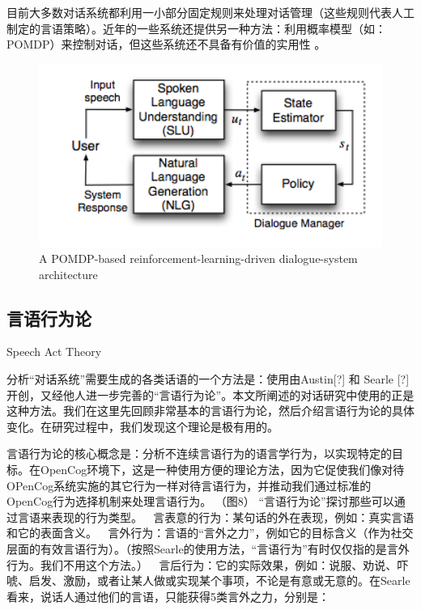 目前大多数对话系统都利用一小部分固定规则来处理对话管理（这些规则代表人工制定的言语策略）。近年的一些系统还提供另一种方法：利用概率模型（如：POMDP）来控制对话，但这些系统还不具备有价值的实用性\cite{Young2006} \cite{Williams2010}。

\begin{figure}[htb]
\centering
\includegraphics[width=12cm]{figures/pomdp.png}
\caption{ A POMDP-based reinforcement-learning-driven dialogue-system architecture }
\label{fig:dialogue}
\end{figure}


\subsection{言语行为论}{Speech Act Theory}
\label{sec:speechAct}

分析“对话系统”需要生成的各类话语的一个方法是：使用由Austin[?] 和 Searle [?] 开创，又经他人进一步完善的“言语行为论”。本文所阐述的对话研究中使用的正是这种方法。我们在这里先回顾非常基本的言语行为论，然后介绍言语行为论的具体变化。在研究过程中，我们发现这个理论是极有用的。

言语行为论的核心概念是：分析不连续言语行为的语言学行为，以实现特定的目标。在OpenCog环境下，这是一种使用方便的理论方法，因为它促使我们像对待OPenCog系统实施的其它行为一样对待言语行为，并推动我们通过标准的OpenCog行为选择机制来处理言语行为。
（图8）
“言语行为论”探讨那些可以通过言语来表现的行为类型。
	言表意的行为：某句话的外在表现，例如：真实言语和它的表面含义。
	言外行为：言语的“言外之力”，例如它的目标含义（作为社交层面的有效言语行为）。（按照Searle的使用方法，“言语行为”有时仅仅指的是言外行为。我们不用这个方法。）
	言后行为：它的实际效果，例如：说服、劝说、吓唬、启发、激励，或者让某人做或实现某个事项，不论是有意或无意的。在Searle看来，说话人通过他们的言语，只能获得5类言外之力，分别是：

